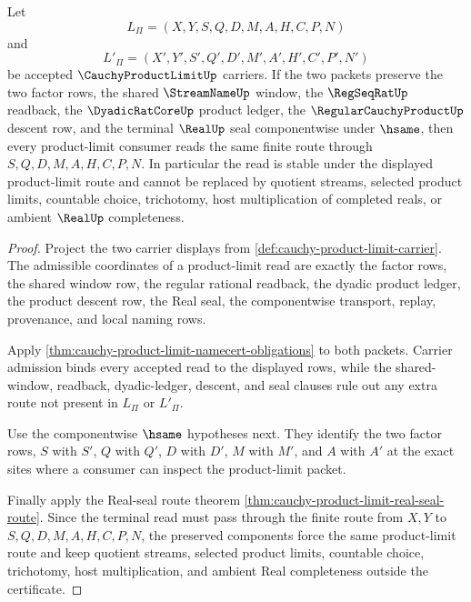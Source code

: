 \begin{theorem}
\label{thm:cauchy-product-limit-shared-window-stability}
Let
$$
L_{\Pi}=(X,Y,S,Q,D,M,A,H,C,P,N)
$$
and
$$
L'_{\Pi}=(X',Y',S',Q',D',M',A',H',C',P',N')
$$
be accepted $\CauchyProductLimitUp$ carriers. If the two packets preserve the two factor rows, the shared $\StreamNameUp$ window, the $\RegSeqRatUp$ readback, the $\DyadicRatCoreUp$ product ledger, the $\RegularCauchyProductUp$ descent row, and the terminal $\RealUp$ seal componentwise under $\hsame$, then every product-limit consumer reads the same finite route through $S,Q,D,M,A,H,C,P,N$. In particular the read is stable under the displayed product-limit route and cannot be replaced by quotient streams, selected product limits, countable choice, trichotomy, host multiplication of completed reals, or ambient $\RealUp$ completeness.
\end{theorem}
\begin{proof}
Project the two carrier displays from \autoref{def:cauchy-product-limit-carrier}. The admissible coordinates of a product-limit read are exactly the factor rows, the shared window row, the regular rational readback, the dyadic product ledger, the product descent row, the Real seal, the componentwise transport, replay, provenance, and local naming rows.

Apply \autoref{thm:cauchy-product-limit-namecert-obligations} to both packets. Carrier admission binds every accepted read to the displayed rows, while the shared-window, readback, dyadic-ledger, descent, and seal clauses rule out any extra route not present in $L_{\Pi}$ or $L'_{\Pi}$.

Use the componentwise $\hsame$ hypotheses next. They identify the two factor rows, $S$ with $S'$, $Q$ with $Q'$, $D$ with $D'$, $M$ with $M'$, and $A$ with $A'$ at the exact sites where a consumer can inspect the product-limit packet.

Finally apply the Real-seal route theorem \autoref{thm:cauchy-product-limit-real-seal-route}. Since the terminal read must pass through the finite route from $X,Y$ to $S,Q,D,M,A,H,C,P,N$, the preserved components force the same product-limit route and keep quotient streams, selected product limits, countable choice, trichotomy, host multiplication, and ambient Real completeness outside the certificate.
\end{proof}


